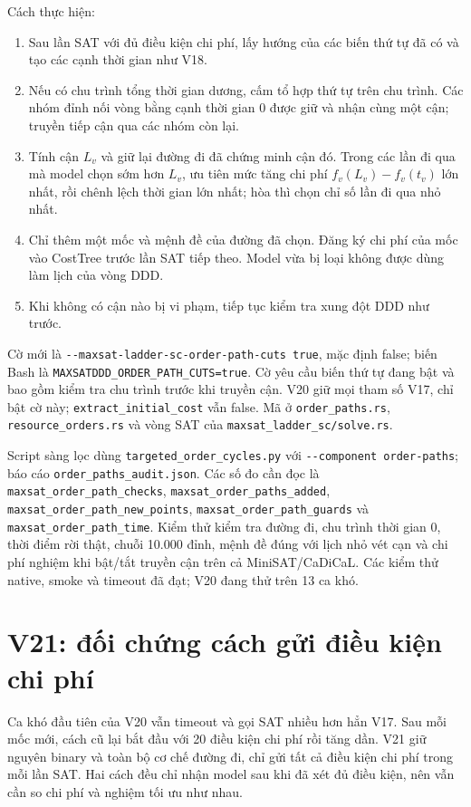 \documentclass[11pt,a4paper]{article}
\newcommand{\code}[1]{\texttt{#1}}
\newcommand{\file}[1]{\nolinkurl{#1}}
\begin{document}
Cách thực hiện:
\begin{enumerate}
\item Sau lần SAT với đủ điều kiện chi phí, lấy hướng của các biến thứ
tự đã có và tạo các cạnh thời gian như V18.
\item Nếu có chu trình tổng thời gian dương, cấm tổ hợp thứ tự trên chu
trình. Các nhóm đỉnh nối vòng bằng cạnh thời gian 0 được giữ và nhận
cùng một cận; truyền tiếp cận qua các nhóm còn lại.
\item Tính cận $L_v$ và giữ lại đường đi đã chứng minh cận đó. Trong các
lần đi qua mà model chọn sớm hơn $L_v$, ưu tiên mức tăng chi phí
$f_v(L_v)-f_v(t_v)$ lớn nhất, rồi chênh lệch thời gian lớn nhất; hòa thì
chọn chỉ số lần đi qua nhỏ nhất.
\item Chỉ thêm một mốc và mệnh đề của đường đã chọn. Đăng ký chi phí của
mốc vào CostTree trước lần SAT tiếp theo. Model vừa bị loại không được
dùng làm lịch của vòng DDD.
\item Khi không có cận nào bị vi phạm, tiếp tục kiểm tra xung đột DDD
như trước.
\end{enumerate}

Cờ mới là \file{--maxsat-ladder-sc-order-path-cuts true}, mặc định false;
biến Bash là \file{MAXSATDDD_ORDER_PATH_CUTS=true}. Cờ yêu cầu biến thứ tự
đang bật và bao gồm kiểm tra chu trình trước khi truyền cận. V20 giữ mọi
tham số V17, chỉ bật cờ này; \code{extract\_initial\_cost} vẫn false.
Mã ở \file{order_paths.rs}, \file{resource_orders.rs} và vòng SAT của
\file{maxsat_ladder_sc/solve.rs}.

Script sàng lọc dùng \file{targeted_order_cycles.py} với
\file{--component order-paths}; báo cáo \file{order_paths_audit.json}.
Các số đo cần đọc là \file{maxsat_order_path_checks},
\file{maxsat_order_paths_added}, \file{maxsat_order_path_new_points},
\file{maxsat_order_path_guards} và \file{maxsat_order_path_time}.
Kiểm thử kiểm tra đường đi, chu trình thời gian 0, thời điểm rời thật,
chuỗi 10.000 đỉnh, mệnh đề đúng với lịch nhỏ vét cạn và chi phí nghiệm
khi bật/tắt truyền cận trên cả MiniSAT/CaDiCaL. Các kiểm thử native,
smoke và timeout đã đạt; V20 đang thử trên 13 ca khó.

\section{V21: đối chứng cách gửi điều kiện chi phí}

Ca khó đầu tiên của V20 vẫn timeout và gọi SAT nhiều hơn hẳn V17.
Sau mỗi mốc mới, cách cũ lại bắt đầu với 20 điều kiện chi phí rồi tăng dần.
V21 giữ nguyên binary và toàn bộ cơ chế đường đi, chỉ gửi tất cả điều kiện
chi phí trong mỗi lần SAT. Hai cách đều chỉ nhận model sau khi đã xét đủ
điều kiện, nên vẫn cần so chi phí và nghiệm tối ưu như nhau.
\end{document}
